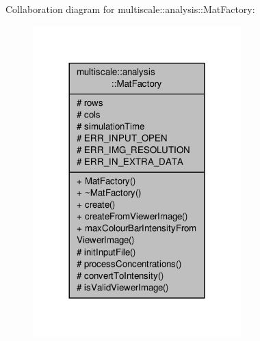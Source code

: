 Collaboration diagram for multiscale\-:\-:analysis\-:\-:Mat\-Factory\-:
\nopagebreak
\begin{figure}[H]
\begin{center}
\leavevmode
\includegraphics[width=228pt]{classmultiscale_1_1analysis_1_1MatFactory__coll__graph}
\end{center}
\end{figure}
